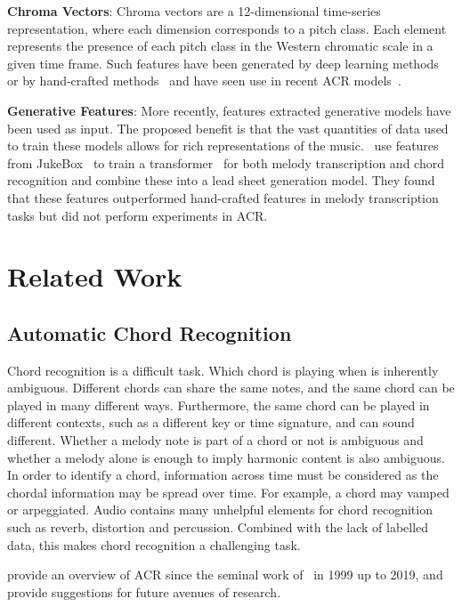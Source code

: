 \textbf{Chroma Vectors}: Chroma vectors are a 12-dimensional time-series representation, where each dimension corresponds to a pitch class. Each element represents the presence of each pitch class in the Western chromatic scale in a given time frame. Such features have been generated by deep learning methods~\citep{BalanceRandomForestACR} or by hand-crafted methods~\citep{NNLSChroma} and have seen use in recent ACR models~\citep{HarmonyTransformer}.

\textbf{Generative Features}: More recently, features extracted generative models have been used as input. The proposed benefit is that the vast quantities of data used to train these models allows for rich representations of the music.~\citet{MelodyTranscriptionViaGenerativePreTraining} use features from JukeBox~\citep{Jukebox} to train a transformer~\citep{AttentionIsAllYouNeed} for both melody transcription and chord recognition and combine these into a lead sheet generation model. They found that these features outperformed hand-crafted features in melody transcription tasks but did not perform experiments in ACR.

\section{Related Work}

\subsection{Automatic Chord Recognition}\label{sec:background-acr}

Chord recognition is a difficult task. Which chord is playing when is inherently ambiguous. Different chords can share the same notes, and the same chord can be played in many different ways. Furthermore, the same chord can be played in different contexts, such as a different key or time signature, and can sound different. Whether a melody note is part of a chord or not is ambiguous and whether a melody alone is enough to imply harmonic content is also ambiguous. In order to identify a chord, information across time must be considered as the chordal information may be spread over time. For example, a chord may vamped or arpeggiated. Audio contains many unhelpful elements for chord recognition such as reverb, distortion and percussion. Combined with the lack of labelled data, this makes chord recognition a challenging task.

\citet{20YearsofACR} provide an overview of ACR since the seminal work of~\citet{FujishimaACR} in 1999 up to 2019, and provide suggestions for future avenues of research.

